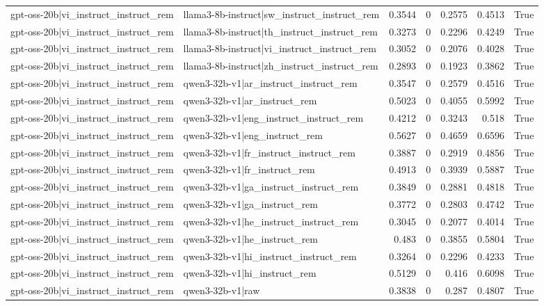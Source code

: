 \begin{table}
\begin{tabular}{l l r r r r l}
gpt-oss-20b|vi_instruct_instruct_rem & llama3-8b-instruct|sw_instruct_instruct_rem & 0.3544 & 0 & 0.2575 & 0.4513 & True \\
gpt-oss-20b|vi_instruct_instruct_rem & llama3-8b-instruct|th_instruct_instruct_rem & 0.3273 & 0 & 0.2296 & 0.4249 & True \\
gpt-oss-20b|vi_instruct_instruct_rem & llama3-8b-instruct|vi_instruct_instruct_rem & 0.3052 & 0 & 0.2076 & 0.4028 & True \\
gpt-oss-20b|vi_instruct_instruct_rem & llama3-8b-instruct|zh_instruct_instruct_rem & 0.2893 & 0 & 0.1923 & 0.3862 & True \\
gpt-oss-20b|vi_instruct_instruct_rem & qwen3-32b-v1|ar_instruct_instruct_rem & 0.3547 & 0 & 0.2579 & 0.4516 & True \\
gpt-oss-20b|vi_instruct_instruct_rem & qwen3-32b-v1|ar_instruct_rem & 0.5023 & 0 & 0.4055 & 0.5992 & True \\
gpt-oss-20b|vi_instruct_instruct_rem & qwen3-32b-v1|eng_instruct_instruct_rem & 0.4212 & 0 & 0.3243 & 0.518 & True \\
gpt-oss-20b|vi_instruct_instruct_rem & qwen3-32b-v1|eng_instruct_rem & 0.5627 & 0 & 0.4659 & 0.6596 & True \\
gpt-oss-20b|vi_instruct_instruct_rem & qwen3-32b-v1|fr_instruct_instruct_rem & 0.3887 & 0 & 0.2919 & 0.4856 & True \\
gpt-oss-20b|vi_instruct_instruct_rem & qwen3-32b-v1|fr_instruct_rem & 0.4913 & 0 & 0.3939 & 0.5887 & True \\
gpt-oss-20b|vi_instruct_instruct_rem & qwen3-32b-v1|ga_instruct_instruct_rem & 0.3849 & 0 & 0.2881 & 0.4818 & True \\
gpt-oss-20b|vi_instruct_instruct_rem & qwen3-32b-v1|ga_instruct_rem & 0.3772 & 0 & 0.2803 & 0.4742 & True \\
gpt-oss-20b|vi_instruct_instruct_rem & qwen3-32b-v1|he_instruct_instruct_rem & 0.3045 & 0 & 0.2077 & 0.4014 & True \\
gpt-oss-20b|vi_instruct_instruct_rem & qwen3-32b-v1|he_instruct_rem & 0.483 & 0 & 0.3855 & 0.5804 & True \\
gpt-oss-20b|vi_instruct_instruct_rem & qwen3-32b-v1|hi_instruct_instruct_rem & 0.3264 & 0 & 0.2296 & 0.4233 & True \\
gpt-oss-20b|vi_instruct_instruct_rem & qwen3-32b-v1|hi_instruct_rem & 0.5129 & 0 & 0.416 & 0.6098 & True \\
gpt-oss-20b|vi_instruct_instruct_rem & qwen3-32b-v1|raw & 0.3838 & 0 & 0.287 & 0.4807 & True \\

\end{tabular}
\end{table}
